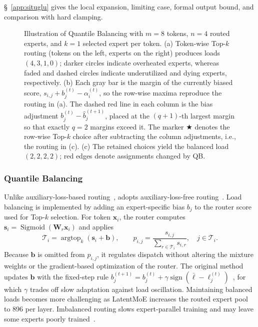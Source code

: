 \S~\ref{app:situglu} gives the local expansion, limiting case, formal output bound, and comparison with hard clamping.


\begin{figure}[t]
    \centering
    
    \caption{Illustration of Quantile Balancing with $m=8$ tokens, $n=4$ routed experts, and $k=1$ selected expert per token.
        (a) Token-wise Top-$k$ routing (tokens on the left, experts on the right) produces loads $(4,3,1,0)$; darker circles indicate overheated experts, whereas faded and dashed circles indicate underutilized and dying experts, respectively.
        (b) Each gray bar is the margin of the currently biased score, $s_{i,j}+b_j^{(t)}-\alpha_i^{(t)}$, so the row-wise maxima reproduce the routing in (a).
        The dashed red line in each column is the bias adjustment $b_j^{(t)}-\widehat{b}_j^{(t+1)}$, placed at the $(q{+}1)$-th largest margin so that exactly $q=2$ margins exceed it.
        The marker \textcolor{brickred}{\ensuremath{\bigstar}} denotes the row-wise Top-$k$ choice after subtracting the column adjustments, i.e., the routing in (c).
        (c) The retained choices yield the balanced load $(2,2,2,2)$; red edges denote assignments changed by QB.}
    \label{fig:quantile-balancing}
\end{figure}

\subsubsection{Quantile Balancing}
\label{sec:qb}
Unlike auxiliary-loss-based routing~\citep{fedus2022switch},  adopts auxiliary-loss-free routing~\citep{deepseekaiv3}.
Load balancing is implemented by adding an expert-specific bias $b_j$ to the router score used for Top-$k$ selection.
For token $\bm{x}_i$, the router computes $\bm{s}_i=\operatorname{Sigmoid}(\mathbf{W}_r\bm{x}_i)$ and applies
\begin{equation}
    \mathcal{T}_i
    = \operatorname{argtop}_{k}\!\left(\bm{s}_i+\bm{b}\right),
    \qquad
    p_{i,j}
    = \frac{s_{i,j}}{\sum_{r\in\mathcal{T}_i}s_{i,r}},
    \quad j\in\mathcal{T}_i.
    \label{eq:moe-routing}
\end{equation}
Because $\bm{b}$ is omitted from $p_{i,j}$, it regulates dispatch without altering the mixture weights or the gradient-based optimization of the router.
The original method updates $\bm{b}$ with the fixed-step rule $b_j^{(t+1)}=b_j^{(t)}+\gamma\operatorname{sign}(\bar{\ell}-\ell_j^{(t)})$~\citep{deepseekaiv3}, for which $\gamma$ trades off slow adaptation against load oscillation.
Maintaining balanced loads becomes more challenging as LatentMoE increases the routed expert pool to 896 per layer.
Imbalanced routing slows expert-parallel training and may leave some experts poorly trained~\citep{huang2026step35flash}.

